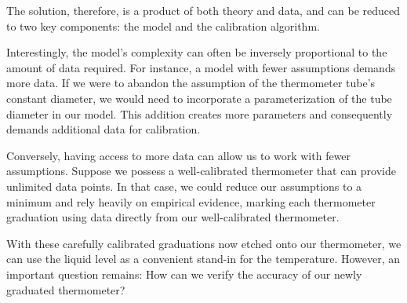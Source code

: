 \begin{bibunit}
The solution, therefore, is a product of both theory and data, and can be reduced to two key components: the model and the calibration algorithm.

Interestingly, the model's complexity can often be inversely proportional to the amount of data required. For instance, a model with fewer assumptions demands more data. If we were to abandon the assumption of the thermometer tube's constant diameter, we would need to incorporate a parameterization of the tube diameter in our model. This addition creates more parameters and consequently demands additional data for calibration.

Conversely, having access to more data can allow us to work with fewer assumptions. Suppose we possess a well-calibrated thermometer that can provide unlimited data points. In that case, we could reduce our assumptions to a minimum and rely heavily on empirical evidence, marking each thermometer graduation using data directly from our well-calibrated thermometer.

With these carefully calibrated graduations now etched onto our thermometer, we can use the liquid level as a convenient stand-in for the temperature. However, an important question remains: How can we verify the accuracy of our newly graduated thermometer?

\begin{figure}[h]
\centering
\begin{tabular}{ccc}


\end{tabular}
\end{figure}
\end{bibunit}
